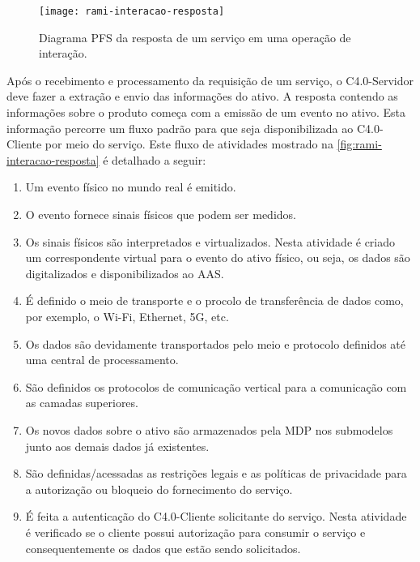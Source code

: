	\begin{figure}[htb]
		\centering
		\caption{Diagrama PFS da resposta de um serviço em uma operação de interação.}
		\label{fig:rami-interacao-resposta}
		\texttt{[image: rami-interacao-resposta]}
	\end{figure}
	
	Após o recebimento e processamento da requisição de um serviço, o C4.0-Servidor deve fazer a extração e envio das informações do ativo. A resposta contendo as informações sobre o produto começa com a emissão de um evento no ativo. Esta informação percorre um fluxo padrão para que seja disponibilizada ao C4.0-Cliente por meio do serviço. Este fluxo de atividades mostrado na \autoref{fig:rami-interacao-resposta} é detalhado a seguir:
	
	\begin{enumerate}
		
		\item Um evento físico no mundo real é emitido.
		
		\item O evento fornece sinais físicos que podem ser medidos.
		 
		\item Os sinais físicos são interpretados e virtualizados. Nesta atividade é criado um correspondente virtual para o evento do ativo físico, ou seja, os dados são digitalizados e disponibilizados ao AAS.
		
		\item É definido o meio de transporte e o procolo de transferência de dados como, por exemplo, o Wi-Fi, Ethernet, 5G, etc.
		
		\item Os dados são devidamente transportados pelo meio e protocolo definidos até uma central de processamento.
		
		\item São definidos os protocolos de comunicação vertical para a comunicação com as camadas superiores.
		
		\item Os novos dados sobre o ativo são armazenados pela MDP nos submodelos junto aos demais dados já existentes.
		
		\item São definidas/acessadas as restrições legais e as políticas de privacidade para a autorização ou bloqueio do fornecimento do serviço.
		
		\item É feita a autenticação do C4.0-Cliente solicitante do serviço. Nesta atividade é verificado se o cliente possui autorização para consumir o serviço e consequentemente os dados que estão sendo solicitados.
		

\end{enumerate}
